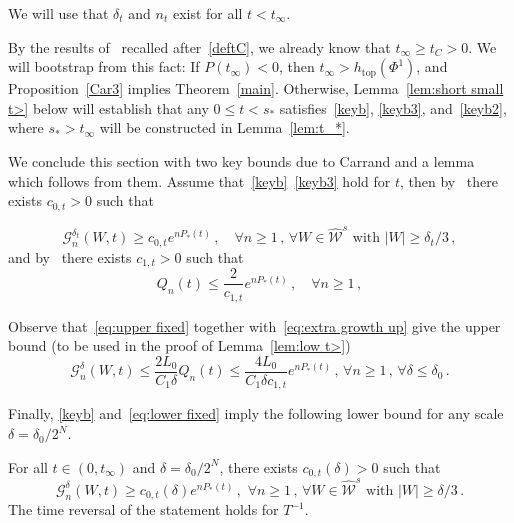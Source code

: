 \documentclass[AHL,Unicode,longabstracts,published]{cedram}
\newcommand{\cG}{\mathcal{G}}
\newcommand{\cW}{\mathcal{W}}
\newcommand{\hW}{\widehat{\cW}}
\newcommand{\htop}{h_{\scriptstyle{\text{top}}}}
\let\oldforall\forall
\renewcommand*{\forall}{\mathrel{\oldforall}}
\newcommand{\htop}{h_{\scriptstyle{\text{top}}}}
\begin{document}
We will use that $\delta_t$ and $n_t$ exist for all $t< t_\infty$.

By the results of~\cite{Ca} recalled after~\eqref{deftC}, we already know that $t_\infty\ge t_C>0$. We will bootstrap from this fact: If $P(t_\infty)<0$, then $t_\infty >\htop(\Phi^1)$, and Proposition~\ref{Car3} implies Theorem~\ref{main}. Otherwise, Lemma~\ref{lem:short small t>} below will establish that any $0\le t<s_*$ satisfies~\eqref{keyb}, \eqref{keyb3}, and~\eqref{keyb2}, where $s_*>t_\infty$ will be constructed in Lemma~\ref{lem:t_*}.


We conclude this section with two key bounds due to Carrand and a lemma which follows from them. Assume that~\eqref{keyb}~\eqref{keyb3} hold for $t$, then by~\cite[Prop 3.7]{Ca} there exists $c_{0, t}>0$ such that

\begin{equation}\label{eq:lower fixed}
\cG_n^{\delta_t}(W,t) \ge c_{0,t} e^{n P_*(t)}\,, \quad \forall n \ge 1\,,\, \forall W\in \hW^s \text{ with } |W| \ge \delta_t/3\,,
\end{equation}
and by~\cite[Proposition~3.10]{Ca} there exists $c_{1,t}>0$ such that
\begin{equation}\label{eq:upper fixed}
Q_n(t) \le \frac 2 {c_{1,t}} e^{n P_*(t)}\,, \quad \forall n \ge 1 \,,
\end{equation}


Observe that~\eqref{eq:upper fixed} together with~\eqref{eq:extra growth up} give the upper bound (to be used in the proof of Lemma~\ref{lem:low t>})
\begin{equation}\label{eq:upper}
\cG_n^\delta(W,t) \le { \frac{ 2 L_0}{C_1 \delta} } Q_n(t)
\le { \frac{ 4 L_0}{C_1 \delta c_{1,t}} } e^{n P_*(t)}
\,,\, \forall n \ge 1\,, \, \forall \delta \le \delta_0 \,.
\end{equation}




Finally, \eqref{keyb} and~\eqref{eq:lower fixed} imply the following lower bound for any scale $\delta = \delta_0/2^N$.

\begin{lemm}\label{thelabel}
For all $t \in (0, t_\infty)$ and $\delta =\delta_0/2^N$, there exists $c_{0,t}(\delta)>0$ such that
\begin{equation}\label{eq:lower fixed'}
\cG_n^{ \delta}(W,t) \ge c_{0,t}(\delta) e^{n P_*(t)}\,, \,\, \forall n \ge 1\,,\, \forall W\in \hW^s \text{ with } |W| \ge \delta/3\,.
\end{equation}
The time reversal of the statement holds for $T^{-1}$.
\end{lemm}
\end{document}
